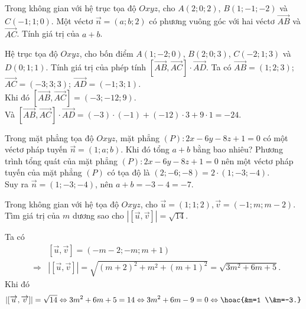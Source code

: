 \begin{ex}%
	Trong không gian với hệ trục tọa độ $Oxyz$, cho $A(2; 0; 2)$, $B(1;-1;-2)$ và $C(-1; 1; 0)$. Một véctơ $\overrightarrow{n}=(a; b; 2)$ có phương vuông góc với hai véctơ $\overrightarrow{AB}$ và $\overrightarrow{AC}$. Tính giá trị của $a+b$.
\end{ex}

\begin{ex}%
	Hệ trục tọa độ $Oxyz$, cho bốn điểm $A(1;-2; 0)$, $B(2; 0; 3)$, $C(-2; 1; 3)$ và $D(0; 1; 1)$. Tính giá trị của phép tính $\left[\overrightarrow{AB}, \overrightarrow{AC}\right] \cdot \overrightarrow{AD}$.
	\loigiai
	{
	Ta có $\overrightarrow{AB}=(1; 2; 3)$; $\overrightarrow{AC}=(-3; 3; 3)$; $\overrightarrow{A D}=(-1; 3; 1)$.\\
	Khi đó $\left[\overrightarrow{A B}, \overrightarrow{A C}\right]=(-3;-12; 9)$.\\
	Và $\left[\overrightarrow{A B}, \overrightarrow{A C}\right] \cdot \overrightarrow{A D}=(-3) \cdot(-1)+(-12) \cdot 3+9 \cdot 1=-24$.
	}
\end{ex}
\begin{ex}%
	Trong mặt phẳng tọa độ $O x y z$, mặt phẳng $(P)\colon 2 x-6 y-8 z+1=0$ có một véctơ pháp tuyến $\vec{n}=(1;a;b)$. Khi đó tổng $a+b$ bằng bao nhiêu? 
	\loigiai
	{
	Phương trình tổng quát của mặt phẳng $(P)\colon 2 x-6 y-8 z+1=0$ nên một véctơ pháp tuyến của mặt phẳng $(P)$ có tọa độ là $(2;-6;-8)=2\cdot (1;-3;-4)$.\\
	Suy ra $\vec{n}=(1;-3;-4)$, nên $a+b=-3-4=-7$.	
	}
\end{ex}

\begin{ex}%
	Trong không gian với hệ tọa độ $O x y z$, cho $\overrightarrow{u}=(1; 1; 2), \overrightarrow{v}=(-1; m; m-2)$. Tìm giá trị của $m$ dương sao cho $|[\overrightarrow{u}, \overrightarrow{v}]|=\sqrt{14}$.
	\loigiai
	{ Ta có {\allowdisplaybreaks
			\begin{eqnarray*}
			&& [\overrightarrow{u}, \overrightarrow{v}]=(-m-2;-m; m+1)\\ &\Rightarrow& |[\overrightarrow{u}, \overrightarrow{v}]|=\sqrt{(m+2)^2+m^2+(m+1)^2}=\sqrt{3 m^2+6 m+5}.
		\end{eqnarray*}}
	Khi đó $$|[\overrightarrow{u}, \overrightarrow{v}]|=\sqrt{14} \Leftrightarrow 3 m^2+6 m+5=14 \Leftrightarrow 3 m^2+6 m-9=0 \Leftrightarrow \hoac{&m=1 \\&m=-3.}$$
	
	}
\end{ex}

